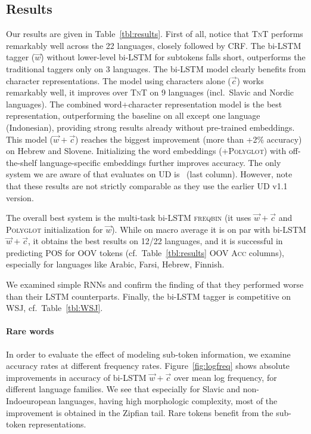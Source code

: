 \documentclass[11pt]{article}
\begin{document}
\subsection{Results}


Our results are given in Table~\ref{tbl:results}. First of all, notice that \textsc{TnT} performs remarkably well across the 22 languages, closely followed by CRF. The bi-LSTM
tagger ($\vec{w}$) without lower-level bi-LSTM for subtokens falls short, outperforms the traditional taggers only on 3 languages. The bi-LSTM model clearly benefits from character 
representations. The model using characters alone ($\vec{c}$) works remarkably well, it improves over \textsc{TnT} on 9 languages (incl.\ Slavic and Nordic languages). The combined word+character representation
model is the best representation, outperforming the baseline on all except one language (Indonesian), providing strong results already without pre-trained embeddings. This model (${\vec{w}+\vec{c}}$) reaches the biggest improvement (more than +2\% accuracy) on Hebrew and Slovene. 
 Initializing the word embeddings (+\textsc{Polyglot}) with off-the-shelf language-specific embeddings further improves accuracy.  
 The only system we are aware of that evaluates on UD is~ (last column). However, note that these results are not strictly comparable as they use the earlier UD v1.1 version.

The overall best system is the multi-task bi-LSTM \textsc{freqbin} (it uses ${\vec{w}+\vec{c}}$ and \textsc{Polyglot} initialization for $\vec{w}$). 
While on macro average it is on par with bi-LSTM ${\vec{w}+\vec{c}}$, it obtains the best results on 12/22 languages, and it is successful in predicting POS for OOV tokens 
(cf.\ Table~\ref{tbl:results} \textsc{OOV Acc} columns), especially for languages like Arabic, Farsi, Hebrew, Finnish. 

We examined simple RNNs and confirm the finding of   that they performed worse than their LSTM counterparts. 
Finally, the bi-LSTM tagger is competitive on WSJ, cf.\ Table~\ref{tbl:WSJ}. 

\paragraph{Rare words} In order to evaluate the effect of modeling sub-token information, we examine accuracy rates at different frequency rates. 
Figure~\ref{fig:logfreq} shows absolute improvements in accuracy of bi-LSTM $\vec{w}+\vec{c}$ over mean log frequency, for different language families. We see that especially for Slavic and non-Indoeuropean languages, having high morphologic complexity, most of the improvement is obtained in the Zipfian tail. Rare tokens benefit from the sub-token representations.
\end{document}
